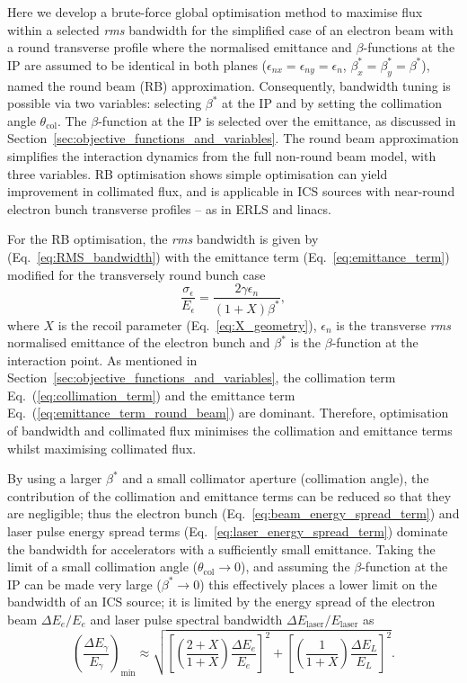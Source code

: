 \documentclass[../main.tex]{subfiles}
\begin{document}
Here we develop a brute-force global optimisation method to maximise flux within a selected \textit{rms} bandwidth for the simplified case of an electron beam with a round transverse profile where the normalised emittance and $\beta$-functions at the IP are assumed to be identical in both planes ($\epsilon_{nx} = \epsilon_{ny} = \epsilon_{n}$, $\beta_{x}^{*} = \beta_{y}^{*} = \beta^{*}$), named the round beam (RB) approximation. Consequently, bandwidth tuning is possible via two variables: selecting $\beta^{*}$ at the IP and by setting the collimation angle $\theta_{\mathrm{col}}$. The $\beta$-function at the IP is selected over the emittance, as discussed in Section~\ref{sec:objective_functions_and_variables}. The round beam approximation simplifies the interaction dynamics from the full non-round beam model, with three variables. RB optimisation shows simple optimisation can yield improvement in collimated flux, and is applicable in ICS sources with near-round electron bunch transverse profiles -- as in ERLS and linacs.

For the RB optimisation, the \textit{rms} bandwidth is given by (Eq.~\ref{eq:RMS_bandwidth}) with the emittance term (Eq.~\ref{eq:emittance_term}) modified for the transversely round bunch case
\begin{equation}
\frac{\sigma_{\epsilon}}{E_{\epsilon}} = \frac{2\gamma\epsilon_{n}}{\left(1+X\right)\beta^{*}},
\label{eq:emittance_term_round_beam}    
\end{equation}
where $X$ is the recoil parameter (Eq.~\ref{eq:X_geometry}), $\epsilon_{n}$ is the transverse \textit{rms} normalised emittance of the electron bunch and $\beta^{*}$ is the $\beta$-function at the interaction point. As mentioned in Section~\ref{sec:objective_functions_and_variables}, the collimation term Eq.~(\ref{eq:collimation_term}) and the emittance term Eq.~(\ref{eq:emittance_term_round_beam}) are dominant. Therefore, optimisation of bandwidth and collimated flux minimises the collimation and emittance terms whilst maximising collimated flux.

By using a larger $\beta^{*}$ and a small collimator aperture (collimation angle), the contribution of the collimation and emittance terms can be reduced so that they are negligible; thus the electron bunch (Eq.~\ref{eq:beam_energy_spread_term}) and laser pulse energy spread terms (Eq.~\ref{eq:laser_energy_spread_term}) dominate the bandwidth for accelerators with a sufficiently small emittance. Taking the limit of a small collimation angle ($\theta_{\mathrm{col}}\rightarrow 0$), and assuming the $\beta$-function at the IP can be made very large ($\beta^{*}\rightarrow 0$) this effectively places a lower limit on the bandwidth of an ICS source; it is limited by the energy spread of the electron beam $\Delta E_{e}/E_{e}$ and laser pulse spectral bandwidth $\Delta E_{\mathrm{laser}}/E_{\mathrm{laser}}$ as 
\begin{equation}
\left(\frac{\Delta E_{\gamma}}{E_{\gamma}}\right)_{\mathrm{min}} \approx \sqrt{\left[\left(\frac{2+X}{1+X}\right)\frac{\Delta E_{e}}{E_{e}}\right]^{2} + \left[\left(\frac{1}{1+X}\right)\frac{\Delta E_{L}}{E_{L}}\right]^{2}}.
\label{eq:bandwidth_limitation_minimum}
\end{equation}
\end{document}
